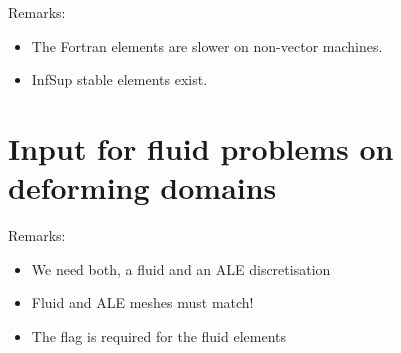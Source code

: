 Remarks:
\begin{itemize}
\item The  Fortran elements are slower on non-vector machines.
\item InfSup stable elements exist.
\end{itemize}

\section{Input for fluid problems on deforming domains}


Remarks:
\begin{itemize}
\item We need both, a fluid and an ALE discretisation
\item Fluid and ALE meshes must match!
\item The  flag is required for the fluid elements
\end{itemize}

